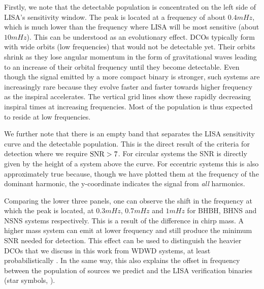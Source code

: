Firstly, we note that the detectable population is concentrated on the left side of LISA's sensitivity window. The peak is located at a frequency of about $0.4 \unit{mHz}$, which is much lower than the frequency where LISA will be most sensitive (about $10 \unit{mHz}$). This can be understood as an evolutionary effect. DCOs typically form with wide orbits (low frequencies) that would not be detectable yet. Their orbits shrink as they lose angular momentum in the form of gravitational waves leading to an increase of their orbital frequency until they become detectable. Even though the signal emitted by a more compact binary is stronger, such systems are increasingly rare because they evolve faster and faster towards higher frequency as the inspiral accelerates. The vertical grid lines show these rapidly decreasing inspiral times at increasing frequencies. Most of the population is thus expected to reside at low frequencies.

We further note that there is an empty band that separates the LISA sensitivity curve and the detectable population. This is the direct result of the criteria for detection where we require $\rm{SNR} > 7$. For circular systems the SNR is directly given by the height of a system above the curve. For eccentric systems this is also approximately true because, though we have plotted them at the frequency of the dominant harmonic, the y-coordinate indicates the signal from \textit{all} harmonics.

Comparing the lower three panels, one can observe the shift in the frequency at which the peak is located, at $0.3 \unit{mHz}$, $0.7 \unit{mHz}$ and $1 \unit{mHz}$ for BHBH, BHNS and NSNS systems respectively. This is a result of the difference in chirp mass. A higher mass system can emit at lower frequency and still produce the minimum SNR needed for detection. This effect can be used to distinguish the heavier DCOs that we discuss in this work from WDWD systems, at least probabilistically \citep[e.g.][]{Sesana+2020}. In the same way, this also explains the offset in frequency between the population of sources we predict and the LISA verification binaries (star symbols, \citealt{Kupfer+2018}).

